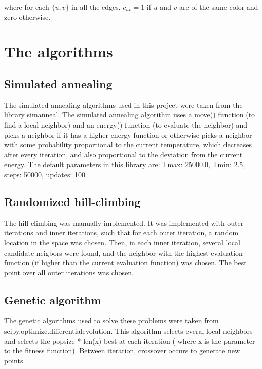 \documentclass[11pt]{article}
\begin{document}
            where for each $\{u, v\}$ in all the edges, $c_{uv} = 1$ if $u$
            and $v$ are of the same color and zero otherwise.

            \section{The algorithms}

            \subsection{Simulated annealing}
            The simulated annealing algorithms used in this project were taken from the library simanneal. The simulated
            annealing algorithm uses a move() function (to find a local neighbor) and an energy() function (to evaluate
            the neighbor) and picks a neighbor if it has a higher energy function or otherwise picks a neighbor with some probability
            proportional to the current temperature, which decreases after every iteration, and also proportional
            to the deviation from the current energy. The default parameters in this library are:
            Tmax: 25000.0, Tmin: 2.5, steps: 50000, updates: 100

            \subsection{Randomized hill-climbing}
            The hill climbing was manually implemented. It was implemented with outer iterations and inner
            iterations, such that for each outer iteration, a random location in the space was chosen. Then,
            in each inner iteration, several local candidate neigbors were found, and the neighbor with the highest evaluation function
            (if higher than the current evaluation function) was chosen. The best point over all outer iterations was
            chosen.

            \subsection{Genetic algorithm}
            The genetic algorithms used to solve these problems were taken from scipy.optimize.differentialevolution.
            This algorithm selects everal local neighbors and selects the popsize * len(x) best at each iteration (
                where x is the parameter to the fitness function). Between iteration, crossover occurs to generate new points.
\end{document}
